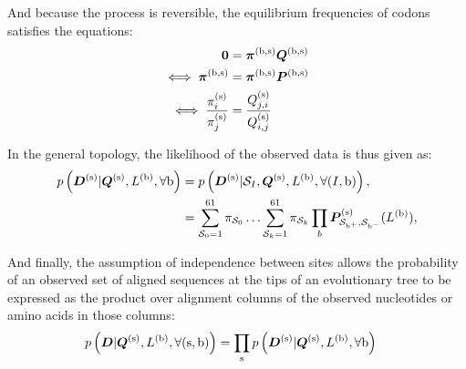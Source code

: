 And because the process is reversible, the equilibrium frequencies of codons satisfies the equations:
\begin{align}
\bm{0} & = \bm{\pi}^{(\text{b}, \text{s})} \bm{Q}^{(\text{b}, \text{s})} \\
\iff \bm{\pi}^{(\text{b}, \text{s})} & = \bm{\pi}^{(\text{b}, \text{s})} \bm{P}^{(\text{b}, \text{s})} \\
\iff \dfrac{\pi_{{i}}^{(\text{s})}}{\pi_{{j}}^{(\text{s})}} & = \dfrac{Q_{{j}, {i}}^{(\text{s})}}{Q_{{i}, {j}}^{(\text{s})}}
\end{align}

In the general topology, the likelihood of the observed data is thus given as:
\begin{align}
p\left(\bm{D}^{(\text{s})}| \bm{Q}^{(\text{s})}, L^{(\text{b})}, \forall \text{b} \right) & = p\left(\bm{D}^{(\text{s})}| \mathcal{S}_{I}, \bm{Q}^{(\text{s})}, L^{(\text{b})}, \forall (I, \text{b}) \right), \\
& = \sum_{\mathcal{S}_{0}=1}^{61} \pi_{\mathcal{S}_{0}} \hdots \sum_{\mathcal{S}_{k}=1}^{61} \pi_{\mathcal{S}_{k}} \prod_{b} \bm{P}^{(\text{s})}_{\mathcal{S}_{\text{b}^{+}}, \mathcal{S}_{\text{b}^{-}}}(L^{(\text{b})}), \label{eq:likelihood-site}
\end{align}

And finally, the assumption of independence between sites allows the probability of an observed set of aligned sequences at the tips of an evolutionary tree to be expressed as the product over alignment columns of the observed nucleotides or amino acids in those columns:
\begin{align}
p\left(\bm{D}| \bm{Q}^{(\text{s})}, L^{(\text{b})}, \forall (\text{s}, \text{b}) \right) & = \prod_{\text{s}} p\left(\bm{D}^{(\text{s})}| \bm{Q}^{(\text{s})}, L^{(\text{b})}, \forall \text{b} \right) \label{eq:likelihood}
\end{align} 
